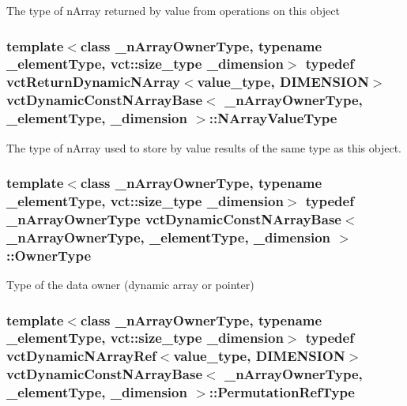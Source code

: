 The type of n\-Array returned by value from operations on this object \hypertarget{classvct_dynamic_const_n_array_base_a40632d0d6ab17d8fc3ea2097f889bffa}{
\subsubsection[{N\-Array\-Value\-Type}]{\setlength{\rightskip}{0pt plus 5cm}template$<$class \-\_\-n\-Array\-Owner\-Type, typename \-\_\-element\-Type, vct\-::size\-\_\-type \-\_\-dimension$>$ typedef {\bf vct\-Return\-Dynamic\-N\-Array}$<$value\-\_\-type, {\bf D\-I\-M\-E\-N\-S\-I\-O\-N}$>$ {\bf vct\-Dynamic\-Const\-N\-Array\-Base}$<$ \-\_\-n\-Array\-Owner\-Type, \-\_\-element\-Type, \-\_\-dimension $>$\-::{\bf N\-Array\-Value\-Type}}}\label{classvct_dynamic_const_n_array_base_a40632d0d6ab17d8fc3ea2097f889bffa}
The type of n\-Array used to store by value results of the same type as this object. \hypertarget{classvct_dynamic_const_n_array_base_aad4328d01dc43be4b9047d594ed2ae8d}{
\subsubsection[{Owner\-Type}]{\setlength{\rightskip}{0pt plus 5cm}template$<$class \-\_\-n\-Array\-Owner\-Type, typename \-\_\-element\-Type, vct\-::size\-\_\-type \-\_\-dimension$>$ typedef \-\_\-n\-Array\-Owner\-Type {\bf vct\-Dynamic\-Const\-N\-Array\-Base}$<$ \-\_\-n\-Array\-Owner\-Type, \-\_\-element\-Type, \-\_\-dimension $>$\-::{\bf Owner\-Type}}}\label{classvct_dynamic_const_n_array_base_aad4328d01dc43be4b9047d594ed2ae8d}
Type of the data owner (dynamic array or pointer) \hypertarget{classvct_dynamic_const_n_array_base_a968acf814b972b47aa2ea39105e67fb3}{
\subsubsection[{Permutation\-Ref\-Type}]{\setlength{\rightskip}{0pt plus 5cm}template$<$class \-\_\-n\-Array\-Owner\-Type, typename \-\_\-element\-Type, vct\-::size\-\_\-type \-\_\-dimension$>$ typedef {\bf vct\-Dynamic\-N\-Array\-Ref}$<$value\-\_\-type, {\bf D\-I\-M\-E\-N\-S\-I\-O\-N}$>$ {\bf vct\-Dynamic\-Const\-N\-Array\-Base}$<$ \-\_\-n\-Array\-Owner\-Type, \-\_\-element\-Type, \-\_\-dimension $>$\-::{\bf Permutation\-Ref\-Type}}}\label{classvct_dynamic_const_n_array_base_a968acf814b972b47aa2ea39105e67fb3}
